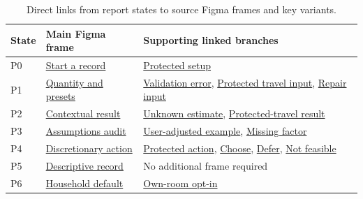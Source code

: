 \documentclass[12pt,a4paper]{article}
\begin{document}
\begin{table}[H]
\centering\small
\caption{Direct links from report states to source Figma frames and key variants.}
\label{tab:figma-frame-links}
\begin{tabularx}{\textwidth}{|p{1.25cm}|p{4.6cm}|X|}
\toprule
\textbf{State}&\textbf{Main Figma frame}&\textbf{Supporting linked branches}\\
\midrule
P0 & \href{https://www.figma.com/design/L1kEH28shvU8494m2Y7EnT?node-id=4-12}{Start a record} & \href{https://www.figma.com/design/L1kEH28shvU8494m2Y7EnT?node-id=4-22}{Protected setup}\\
P1 & \href{https://www.figma.com/design/L1kEH28shvU8494m2Y7EnT?node-id=4-32}{Quantity and presets} & \href{https://www.figma.com/design/L1kEH28shvU8494m2Y7EnT?node-id=4-42}{Validation error}, \href{https://www.figma.com/design/L1kEH28shvU8494m2Y7EnT?node-id=5-2}{Protected travel input}, \href{https://www.figma.com/design/L1kEH28shvU8494m2Y7EnT?node-id=5-12}{Repair input}\\
P2 & \href{https://www.figma.com/design/L1kEH28shvU8494m2Y7EnT?node-id=4-52}{Contextual result} & \href{https://www.figma.com/design/L1kEH28shvU8494m2Y7EnT?node-id=4-62}{Unknown estimate}, \href{https://www.figma.com/design/L1kEH28shvU8494m2Y7EnT?node-id=5-22}{Protected-travel result}\\
P3 & \href{https://www.figma.com/design/L1kEH28shvU8494m2Y7EnT?node-id=4-72}{Assumptions audit} & \href{https://www.figma.com/design/L1kEH28shvU8494m2Y7EnT?node-id=4-82}{User-adjusted example}, \href{https://www.figma.com/design/L1kEH28shvU8494m2Y7EnT?node-id=5-32}{Missing factor}\\
P4 & \href{https://www.figma.com/design/L1kEH28shvU8494m2Y7EnT?node-id=4-92}{Discretionary action} & \href{https://www.figma.com/design/L1kEH28shvU8494m2Y7EnT?node-id=4-102}{Protected action}, \href{https://www.figma.com/design/L1kEH28shvU8494m2Y7EnT?node-id=5-42}{Choose}, \href{https://www.figma.com/design/L1kEH28shvU8494m2Y7EnT?node-id=5-52}{Defer}, \href{https://www.figma.com/design/L1kEH28shvU8494m2Y7EnT?node-id=5-62}{Not feasible}\\
P5 & \href{https://www.figma.com/design/L1kEH28shvU8494m2Y7EnT?node-id=4-112}{Descriptive record} & No additional frame required\\
P6 & \href{https://www.figma.com/design/L1kEH28shvU8494m2Y7EnT?node-id=4-122}{Household default} & \href{https://www.figma.com/design/L1kEH28shvU8494m2Y7EnT?node-id=4-132}{Own-room opt-in}\\
\bottomrule
\end{tabularx}
\end{table}
\end{document}
